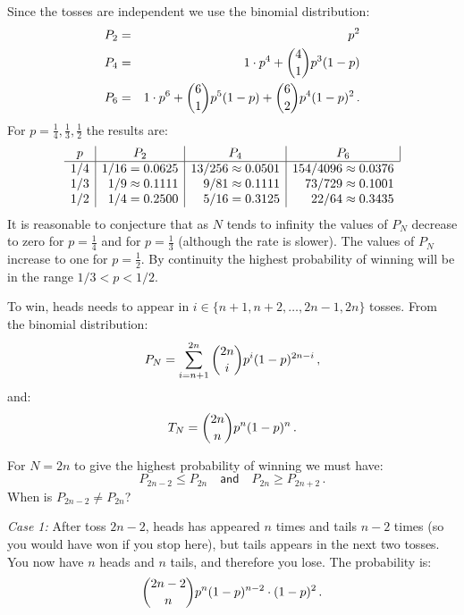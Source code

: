 \solution{}

 Since the tosses are independent we use the binomial distribution:
\begin{eqnarray*}
P_2 &=& p^2\\
P_4 &=& 1\cdot p^4 + \displaystyle{4 \choose 1}p^3(1-p)\\
P_6 &=& 1\cdot p^6 + \displaystyle{6 \choose 1}p^5(1-p)+\displaystyle{6 \choose 2}p^4(1-p)^2\,.
\end{eqnarray*}
For $p=\frac{1}{4}, \frac{1}{3}, \frac{1}{2}$ the results are:
\[
\begin{array}{r|r|r|r}
\multicolumn{1}{c|}{p}& \multicolumn{1}{c|}{P_2} & \multicolumn{1}{c|}{P_4} & \multicolumn{1}{c|}{P_6}\\\hline
1/4 & 1/16=0.0625 & 13/256\approx 0.0501&154/4096\approx 0.0376\\
1/3 & 1/9\approx 0.1111 & 9/81\approx 0.1111&73/729\approx 0.1001\\
1/2 & 1/4=0.2500 & 5/16= 0.3125&22/64\approx 0.3435
\end{array}
\]
It is reasonable to conjecture that as $N$ tends to infinity the values of $P_N$ decrease to zero for $p=\frac{1}{4}$ and for $p=\frac{1}{3}$ (although the rate is slower). The values of $P_N$ increase to one for $p=\frac{1}{2}$. By continuity the highest probability of winning will be in the range $1/3 < p < 1/2$.

 To win, heads needs to appear in $i\in\{n+1, n+2, \ldots, 2n-1, 2n\}$ tosses. From the binomial distribution:
\[
P_N = \sum_{i=n+1}^{2n} \displaystyle{2n \choose i} p^i (1-p)^{2n-i}\,,
\]
and:
\[
T_N = \displaystyle{2n \choose n} p^n (1-p)^{n}\,.
\]

 For $N=2n$ to give the highest probability of winning we must have:
\[
P_{2n-2} \leq P_{2n} \quad \textsf{and} \quad P_{2n}\geq P_{2n+2}\,.
\]
When is $P_{2n-2}\not = P_{2n}$?

\textit{Case 1:}
After toss $2n-2$, heads has appeared $n$ times and tails  $n-2$ times (so you would have won if you stop here), but tails appears in the next two tosses. You now have $n$ heads and $n$ tails, and therefore you lose. The probability is:
\[
\displaystyle{2n-2 \choose n}p^n(1-p)^{n-2} \cdot (1-p)^2\,.
\]

